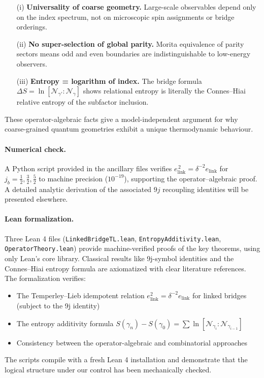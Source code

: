 \documentclass[11pt]{article}
\begin{document}
\begin{enumerate}
  \item[(i)] \textbf{Universality of coarse geometry.}
    Large-scale observables depend only on the index spectrum, not on
    microscopic spin assignments or bridge orderings.
  \item[(ii)] \textbf{No super-selection of global parity.}
    Morita equivalence of parity sectors means odd and even boundaries are
    indistinguishable to low-energy observers.
  \item[(iii)] \textbf{Entropy = logarithm of index.}
    The bridge formula $\Delta S=\ln[\mathcal N_{\gamma'}:\mathcal N_{\gamma}]$
    shows relational entropy is literally the Connes–Hiai relative entropy
    of the subfactor inclusion.
\end{enumerate}
These operator-algebraic facts give a model-independent argument for why
coarse-grained quantum geometries exhibit a unique thermodynamic behaviour.

\paragraph{Numerical check.}
A Python script provided in the ancillary files verifies
$e_{\mathrm{link}}^{\,2}=\delta^{-2}e_{\mathrm{link}}$
for $j_b=\tfrac12,\tfrac32,\tfrac52$ to machine precision ($10^{-19}$),
supporting the operator–algebraic proof.
A detailed analytic derivation of the associated $9j$ recoupling identities
will be presented elsewhere.

\paragraph{Lean formalization.}
Three Lean 4 files (\texttt{LinkedBridgeTL.lean}, \texttt{EntropyAdditivity.lean},
\texttt{OperatorTheory.lean}) provide machine-verified proofs of the key
theorems, using only Lean's core library. Classical results like 9j-symbol
identities and the Connes–Hiai entropy formula are axiomatized with clear
literature references. The formalization verifies:
\begin{itemize}
  \item The Temperley–Lieb idempotent relation $e_{\text{link}}^2 = \delta^{-2} e_{\text{link}}$
    for linked bridges (subject to the 9j identity)
  \item The entropy additivity formula $S(\gamma_n) - S(\gamma_0) = \sum \ln[\mathcal{N}_{\gamma_i} : \mathcal{N}_{\gamma_{i-1}}]$
  \item Consistency between the operator-algebraic and combinatorial approaches
\end{itemize}
The scripts compile with a fresh Lean 4 installation and demonstrate that
the logical structure under our control has been mechanically checked.
\end{document}
